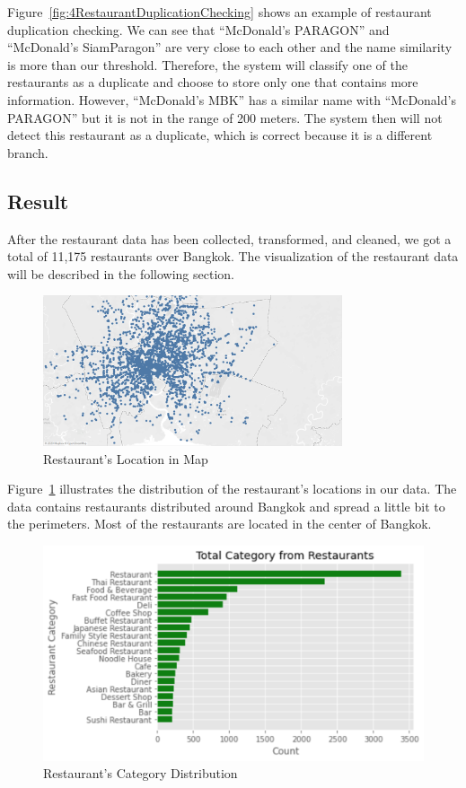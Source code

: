 \documentclass[12pt,oneside,openright,a4paper]{cpe-english-project}
\begin{document}
Figure~\ref{fig:4RestaurantDuplicationChecking} shows an example of restaurant duplication checking. We can see that “McDonald’s PARAGON” and “McDonald’s SiamParagon” are very close to each other and the name similarity is more than our threshold. Therefore, the system will classify one of the restaurants as a duplicate and choose to store only one that contains more information. However, “McDonald’s MBK” has a similar name with “McDonald’s PARAGON” but it is not in the range of 200 meters. The system then will not detect this restaurant as a duplicate, which is correct because it is a different branch.

\subsection{Result}

After the restaurant data has been collected, transformed, and cleaned, we got a total of 11,175 restaurants over Bangkok. The visualization of the restaurant data will be described in the following section.

\begin{figure}[H]\centering
\includegraphics[width=250pt]{./images/4RestaurantsLocationinMap.png}
\caption{Restaurant’s Location in Map}\label{fig:4RestaurantsLocationinMap}
\end{figure}

Figure~\ref{fig:4RestaurantsLocationinMap} illustrates the distribution of the restaurant’s locations in our data. The data contains restaurants distributed around Bangkok and spread a little bit to the perimeters. Most of the restaurants are located in the center of Bangkok.

\begin{figure}[H]\centering
\includegraphics[width=350pt]{./images/4RestaurantsCategoryDistribution.png}
\caption{Restaurant’s Category Distribution}\label{fig:4RestaurantsCategoryDistribution}
\end{figure}
\end{document}
